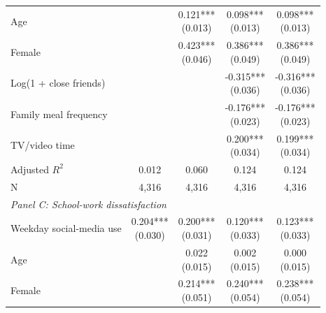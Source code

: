 \begin{table}[!htbp]
\begin{tabular}{lcccc}
\\
Age &  & \shortstack[c]{0.121*** \\[-0.35ex] (0.013)} & \shortstack[c]{0.098*** \\[-0.35ex] (0.013)} & \shortstack[c]{0.098*** \\[-0.35ex] (0.013)}
\\
Female &  & \shortstack[c]{0.423*** \\[-0.35ex] (0.046)} & \shortstack[c]{0.386*** \\[-0.35ex] (0.049)} & \shortstack[c]{0.386*** \\[-0.35ex] (0.049)}
\\
Log(1 + close friends) &  &  & \shortstack[c]{-0.315*** \\[-0.35ex] (0.036)} & \shortstack[c]{-0.316*** \\[-0.35ex] (0.036)}
\\
Family meal frequency &  &  & \shortstack[c]{-0.176*** \\[-0.35ex] (0.023)} & \shortstack[c]{-0.176*** \\[-0.35ex] (0.023)}
\\
TV/video time &  &  & \shortstack[c]{0.200*** \\[-0.35ex] (0.034)} & \shortstack[c]{0.199*** \\[-0.35ex] (0.034)}
\\
\hline
Adjusted $R^2$ & 0.012 & 0.060 & 0.124 & 0.124
\\
N & 4,316 & 4,316 & 4,316 & 4,316
\\
\hline
\multicolumn{5}{l}{\textit{Panel C: School-work dissatisfaction}} \\
\hline
Weekday social-media use & \shortstack[c]{0.204*** \\[-0.35ex] (0.030)} & \shortstack[c]{0.200*** \\[-0.35ex] (0.031)} & \shortstack[c]{0.120*** \\[-0.35ex] (0.033)} & \shortstack[c]{0.123*** \\[-0.35ex] (0.033)}
\\
Age &  & \shortstack[c]{0.022 \\[-0.35ex] (0.015)} & \shortstack[c]{0.002 \\[-0.35ex] (0.015)} & \shortstack[c]{0.000 \\[-0.35ex] (0.015)}
\\
Female &  & \shortstack[c]{0.214*** \\[-0.35ex] (0.051)} & \shortstack[c]{0.240*** \\[-0.35ex] (0.054)} & \shortstack[c]{0.238*** \\[-0.35ex] (0.054)}

\end{tabular}
\end{table}
